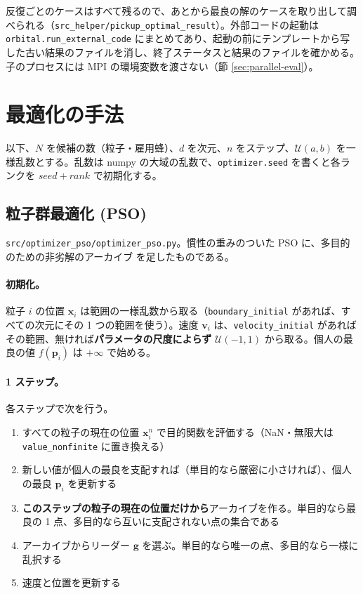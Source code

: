 \documentclass[11pt,a4paper,dvipdfmx]{jsarticle}
\begin{document}
反復ごとのケースはすべて残るので、あとから最良の解のケースを取り出して調べられる（\texttt{src\_helper/pickup\_optimal\_result}）。外部コードの起動は \texttt{orbital.run\_external\_code} にまとめてあり、起動の前にテンプレートから写した古い結果のファイルを消し、終了ステータスと結果のファイルを確かめる。子のプロセスには MPI の環境変数を渡さない（節 \ref{sec:parallel-eval}）。

\section{最適化の手法}\label{sec:methods}

以下、$N$ を候補の数（粒子・雇用蜂）、$d$ を次元、$n$ をステップ、$\mathcal{U}(a,b)$ を一様乱数とする。乱数は numpy の大域の乱数で、\texttt{optimizer.seed} を書くと各ランクを $\mathit{seed} + \mathit{rank}$ で初期化する。

\subsection{粒子群最適化 (PSO)}\label{sec:pso}

\texttt{src/optimizer\_pso/optimizer\_pso.py}。慣性の重みのついた PSO \cite{kennedy1995,shi1998} に、多目的のための非劣解のアーカイブ \cite{coello2004} を足したものである。

\paragraph{初期化。} 粒子 $i$ の位置 $\mathbf{x}_i$ は範囲の一様乱数から取る（\texttt{boundary\_initial} があれば、すべての次元にその 1 つの範囲を使う）。速度 $\mathbf{v}_i$ は、\texttt{velocity\_initial} があればその範囲、無ければ\textbf{パラメータの尺度によらず} $\mathcal{U}(-1, 1)$ から取る。個人の最良の値 $f(\mathbf{p}_i)$ は $+\infty$ で始める。

\paragraph{1 ステップ。} 各ステップで次を行う。

\begin{enumerate}
\item すべての粒子の現在の位置 $\mathbf{x}_i^n$ で目的関数を評価する（NaN・無限大は \texttt{value\_nonfinite} に置き換える）
\item 新しい値が個人の最良を支配すれば（単目的なら厳密に小さければ）、個人の最良 $\mathbf{p}_i$ を更新する
\item \textbf{このステップの粒子の現在の位置だけから}アーカイブを作る。単目的なら最良の 1 点、多目的なら互いに支配されない点の集合である
\item アーカイブからリーダー $\mathbf{g}$ を選ぶ。単目的なら唯一の点、多目的なら一様に乱択する
\item 速度と位置を更新する
\end{enumerate}
\end{document}

